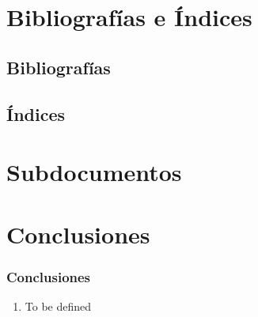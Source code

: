 \documentclass[a4paper,slidestop,xcolor=pst,dvips,blue]{beamer}
\begin{document}
\section{Bibliografías e Índices}

\subsection{Bibliografías}

\subsection{Índices}

\section{Subdocumentos}

\section{Conclusiones}

\begin{frame}[c]
	\frametitle{Conclusiones}
	\begin{enumerate}[<+->]
		\item To be defined
	\end{enumerate}
\end{frame}

%    
%    
\end{document}

